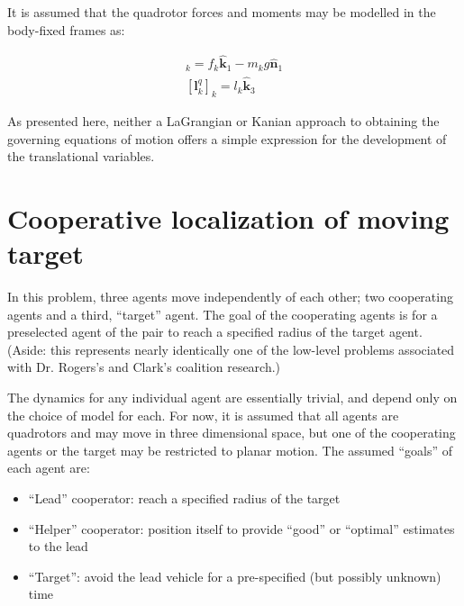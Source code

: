 \documentclass{aiaa-tc}
\newcommand{\br}[2]{[#1]_{#2}} %
\newcommand{\B}[1]{\textbf{#1}} %
\newcommand{\U}[1]{\hat{\textbf{#1}}} %
\begin{document}
It is assumed that the quadrotor forces and moments may be modelled in the body-fixed frames as:

\begin{align}
\br{\B{f}^q_k}{k} = f_k\U{k}_1 - m_k g \U{n}_1\\
\br{\B{l}^q_k}{k} = l_k\U{k}_3
\end{align}

As presented here, neither a LaGrangian or Kanian approach to obtaining the governing equations of motion offers a simple expression for the development of the translational variables.


\section{Cooperative localization of moving target}

In this problem, three agents move independently of each other; two cooperating agents and a third, ``target'' agent. The goal of the cooperating agents is for a preselected agent of the pair to reach a specified radius of the target agent. (Aside: this represents nearly identically one of the low-level problems associated with Dr. Rogers's and Clark's coalition research.) 

The dynamics for any individual agent are essentially trivial, and depend only on the choice of model for each. For now, it is assumed that all agents are quadrotors and may move in three dimensional space, but one of the cooperating agents or the target may be restricted to planar motion. The assumed ``goals'' of each agent are:

\begin{itemize}
\item ``Lead'' cooperator: reach a specified radius of the target \\
\item ``Helper'' cooperator: position itself to provide ``good'' or ``optimal'' estimates to the lead \\
\item ``Target'': avoid the lead vehicle for a pre-specified (but possibly unknown) time
\end{itemize}
\end{document}
